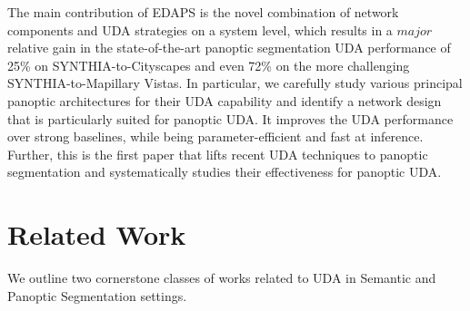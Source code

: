 \documentclass[10pt,twocolumn,letterpaper]{article}
\begin{document}
The main contribution of EDAPS is the novel combination of network components and UDA strategies on a system level, which results in a $major$ relative gain in the state-of-the-art panoptic segmentation UDA performance of 25\% on SYNTHIA-to-Cityscapes and even 72\% on the more challenging SYNTHIA-to-Mapillary Vistas.
In particular, we carefully study various principal panoptic architectures for their UDA capability and identify a network design that is particularly suited for panoptic UDA. It improves the UDA performance over strong baselines, while being parameter-efficient and fast at inference.
Further, this is the first paper that lifts recent UDA techniques to panoptic segmentation and systematically studies their effectiveness for panoptic UDA.












 \section{Related Work}
\label{sec:relwork}
We outline two cornerstone classes of works related to UDA in Semantic and Panoptic Segmentation settings.
\end{document}
